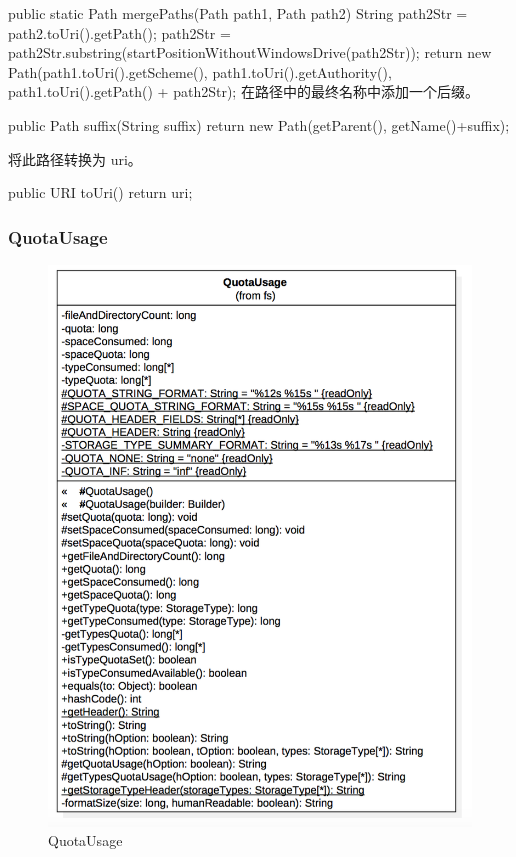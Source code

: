 \begin{java}
public static Path mergePaths(Path path1, Path path2) {
  String path2Str = path2.toUri().getPath();
  path2Str = path2Str.substring(startPositionWithoutWindowsDrive(path2Str));
  return new Path(path1.toUri().getScheme(),
      path1.toUri().getAuthority(),
      path1.toUri().getPath() + path2Str);
}
在路径中的最终名称中添加一个后缀。
\begin{java}
public Path suffix(String suffix) {
  return new Path(getParent(), getName()+suffix);
}
\end{java}
将此路径转换为 uri。
\begin{java}
public URI toUri() { return uri; }
\end{java}


\subsubsection{QuotaUsage}
\begin{figure}
\centering
\includegraphics[width =1\linewidth]{uml/outputstream/8.png}
\caption{QuotaUsage}
\label{fig:QuotaUsage}
\end{figure}


\end{java}
